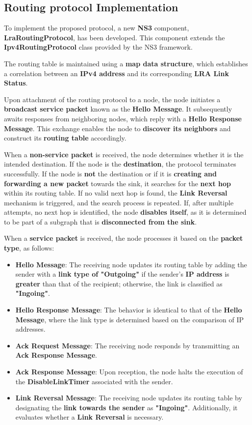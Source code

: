 \documentclass[../report.tex]{subfiles}
\begin{document}
\subsection{Routing protocol Implementation}
To implement the proposed protocol, a new \textbf{NS3} component, \textbf{LraRoutingProtocol}, has been developed. This component extends the \textbf{Ipv4RoutingProtocol} class provided by the NS3 framework.

The routing table is maintained using a \textbf{map data structure}, which establishes a correlation between an \textbf{IPv4 address} and its corresponding \textbf{LRA Link Status}.

Upon attachment of the routing protocol to a node, the node initiates a \textbf{broadcast service packet} known as the \textbf{Hello Message}. It subsequently awaits responses from neighboring nodes, which reply with a \textbf{Hello Response Message}. This exchange enables the node to \textbf{discover its neighbors} and construct its \textbf{routing table} accordingly.

When a \textbf{non-service packet} is received, the node determines whether it is the intended destination. If the node is the \textbf{destination}, the protocol terminates successfully. If the node is \textbf{not} the destination or if it is \textbf{creating and forwarding a new packet} towards the sink, it searches for the \textbf{next hop} within its routing table. If no valid next hop is found, the \textbf{Link Reversal} mechanism is triggered, and the search process is repeated. If, after multiple attempts, no next hop is identified, the node \textbf{disables itself}, as it is determined to be part of a subgraph that is \textbf{disconnected from the sink}.

When a \textbf{service packet} is received, the node processes it based on the \textbf{packet type}, as follows:

\begin{itemize}
    \item \textbf{Hello Message}: The receiving node updates its routing table by adding the sender with a \textbf{link type of "Outgoing"} if the sender's \textbf{IP address} is \textbf{greater} than that of the recipient; otherwise, the link is classified as \textbf{"Ingoing"}.
    \item \textbf{Hello Response Message}: The behavior is identical to that of the \textbf{Hello Message}, where the link type is determined based on the comparison of IP addresses.
    \item \textbf{Ack Request Message}: The receiving node responds by transmitting an \textbf{Ack Response Message}.
    \item \textbf{Ack Response Message}: Upon reception, the node halts the execution of the \textbf{DisableLinkTimer} associated with the sender.
    \item \textbf{Link Reversal Message}: The receiving node updates its routing table by designating the \textbf{link towards the sender} as \textbf{"Ingoing"}. Additionally, it evaluates whether a \textbf{Link Reversal} is necessary.
\end{itemize}
\end{document}
